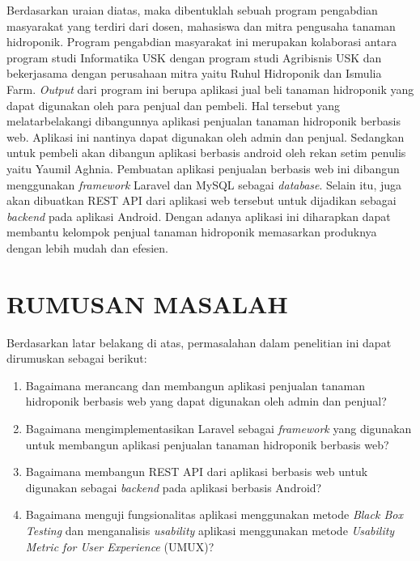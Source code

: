 \par Berdasarkan uraian diatas, maka dibentuklah sebuah program pengabdian masyarakat yang terdiri dari dosen, mahasiswa dan mitra pengusaha tanaman hidroponik. Program pengabdian masyarakat ini merupakan kolaborasi antara program studi Informatika USK dengan program studi Agribisnis USK dan bekerjasama dengan perusahaan mitra yaitu Ruhul Hidroponik dan Ismulia Farm. \textit{Output} dari program ini berupa aplikasi jual beli tanaman hidroponik yang dapat digunakan oleh para penjual dan pembeli. Hal tersebut yang melatarbelakangi dibangunnya aplikasi penjualan tanaman hidroponik berbasis web. Aplikasi ini nantinya dapat digunakan oleh admin dan penjual. Sedangkan untuk pembeli akan dibangun aplikasi berbasis android oleh rekan setim penulis yaitu Yaumil Aghnia. Pembuatan aplikasi penjualan berbasis web ini dibangun menggunakan \textit{framework} Laravel dan MySQL sebagai \textit{database}. Selain itu, juga akan dibuatkan REST API dari aplikasi web tersebut untuk dijadikan sebagai \textit{backend} pada aplikasi Android. Dengan adanya aplikasi ini diharapkan dapat membantu kelompok penjual tanaman hidroponik memasarkan produknya dengan lebih mudah dan efesien.

\fancyhf{} 
\fancyfoot[R]{\thepage}

\section{\uppercase{RUMUSAN MASALAH}}
Berdasarkan latar belakang di atas, permasalahan dalam penelitian ini dapat dirumuskan sebagai berikut:
\begin{enumerate}
	\item Bagaimana merancang dan membangun aplikasi penjualan tanaman hidroponik berbasis web yang dapat digunakan oleh admin dan penjual?
	\item Bagaimana mengimplementasikan Laravel sebagai \textit{framework} yang digunakan untuk membangun aplikasi penjualan tanaman hidroponik berbasis web?
	\item Bagaimana membangun REST API dari aplikasi berbasis web untuk digunakan sebagai \textit{backend}  pada aplikasi berbasis Android?
	\item Bagaimana menguji fungsionalitas aplikasi menggunakan metode \textit{Black Box Testing} dan menganalisis \textit{usability} aplikasi menggunakan metode \textit{Usability Metric for User Experience} (UMUX)?
\end{enumerate}

